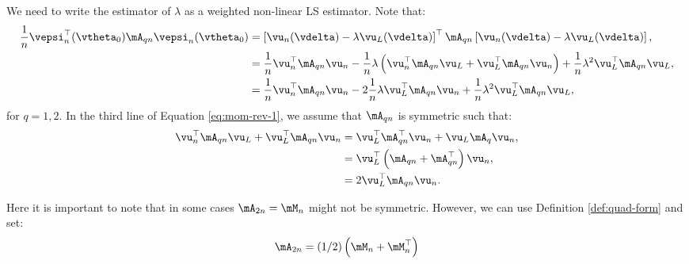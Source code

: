 We need to write the estimator of $\lambda$ as a weighted non-linear LS estimator. Note that:
\begin{equation}\label{eq:mom-rev-1}
\begin{aligned}
  \frac{1}{n}\vepsi^\top_n(\vtheta_0)\mA_{qn}\vepsi_n(\vtheta_0) & = \left[\vu_n(\vdelta) - \lambda \vu_L(\vdelta)\right]^\top \mA_{qn} \left[\vu_n(\vdelta) - \lambda \vu_L(\vdelta)\right], \\
                               & = \frac{1}{n}\vu^\top_n\mA_{qn}\vu_n - \frac{1}{n}\lambda\left(\vu^\top_n\mA_{qn}\vu_L + \vu_L^\top\mA_{qn}\vu_n\right) +\frac{1}{n}\lambda^2\vu_L^\top\mA_{qn}\vu_L, \\
                               & = \frac{1}{n}\vu^\top_n\mA_{qn}\vu_n - 2\frac{1}{n}\lambda\vu_L^\top\mA_{qn}\vu_n +\frac{1}{n}\lambda^2\vu_L^\top\mA_{qn}\vu_L, \\
\end{aligned}
\end{equation}
%
for $q = 1, 2$. In the third line of Equation \eqref{eq:mom-rev-1}, we assume that $\mA_{qn}$ is symmetric such that:
\begin{equation*}
\begin{aligned}
\vu^\top_n\mA_{qn}\vu_L + \vu_L^\top\mA_{qn}\vu_n & = \vu_L^\top \mA_{qn}^\top\vu_n + \vu_L\mA_q\vu_n, \\
                                        & = \vu_L^\top\left(\mA_{qn} + \mA_{qn}^\top\right) \vu_n, \\
                                        & = 2\vu_L^\top\mA_{qn}\vu_n.
                                        \end{aligned}
\end{equation*}

Here it is important to note that in some cases $\mA_{2n} = \mM_n$ might not be symmetric. However, we can use Definition \ref{def:quad-form} and set:
\begin{equation}\label{eq:trick-A2}
\mA_{2n} = (1/2)\left(\mM_n + \mM^\top_n\right)
\end{equation}

